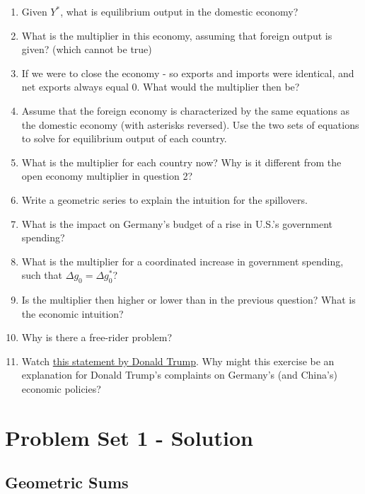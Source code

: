 \documentclass[]{book}
\begin{document}
\begin{enumerate}
\def\labelenumi{\arabic{enumi}.}
\item
  Given \(Y^{*}\), what is equilibrium output in the domestic economy?
\item
  What is the multiplier in this economy, assuming that foreign output
  is given? (which cannot be true)
\item
  If we were to close the economy - so exports and imports were
  identical, and net exports always equal 0. What would the multiplier
  then be?
\item
  Assume that the foreign economy is characterized by the same equations
  as the domestic economy (with asterisks reversed). Use the two sets of
  equations to solve for equilibrium output of each country.
\item
  What is the multiplier for each country now? Why is it different from
  the open economy multiplier in question 2?
\item
  Write a geometric series to explain the intuition for the spillovers.
\item
  What is the impact on Germany's budget of a rise in U.S.'s government
  spending?
\item
  What is the multiplier for a coordinated increase in government
  spending, such that \(\Delta g_0 = \Delta g_0^{*}\)?
\item
  Is the multiplier then higher or lower than in the previous question?
  What is the economic intuition?
\item
  Why is there a free-rider problem?
\item
  Watch \href{https://www.youtube.com/watch?v=mKPRZ7U0yNU}{this
  statement by Donald Trump}. Why might this exercise be an explanation
  for Donald Trump's complaints on Germany's (and China's) economic
  policies?
\end{enumerate}

\chapter{Problem Set 1 - Solution}\label{pset1-sol}

\section{Geometric Sums}\label{geometric-sums-1}
\end{document}
